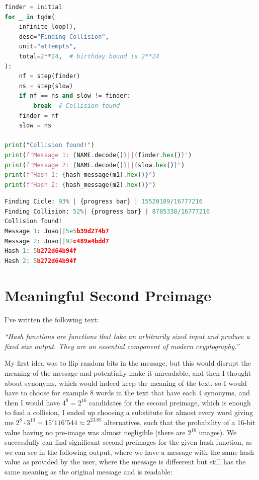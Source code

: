 \documentclass{article}
\begin{document}
\begin{lstlisting}[language=Python]
finder = initial
for _ in tqdm(
    infinite_loop(),
    desc="Finding Collision",
    unit="attempts",
    total=2**24,  # birthday bound is 2**24
):
    nf = step(finder)
    ns = step(slow)
    if nf == ns and slow != finder:
        break  # Collision found
    finder = nf
    slow = ns

print("Collision found!")
print(f"Message 1: {NAME.decode()}||{finder.hex()}")
print(f"Message 2: {NAME.decode()}||{slow.hex()}")
print(f"Hash 1: {hash_message(m1).hex()}")
print(f"Hash 2: {hash_message(m2).hex()}")
\end{lstlisting}


\begin{lstlisting}[language=Python]
Finding Cicle: 93% | {progress bar} | 15520189/16777216
Finding Collision: 52%| {progress bar} | 8785338/16777216
Collision found!
Message 1: Joao||5e5b39d274b7
Message 2: Joao||92c489a4bdd7
Hash 1: 5b272d64b94f
Hash 2: 5b272d64b94f
\end{lstlisting}

\section{Meaningful Second Preimage}
I've written the following text:\\
\begin{center}
    \textit{``Hash functions are functions that take an arbitrarily sized input and produce a fixed size output. They are an essential component of modern cryptography.''}
\end{center}

My first idea was to flip random bits in the message, but this would disrupt the meaning of the message and potentially make it unreadable, and then I thought about synonyms, which would indeed keep the meaning of the text, so I would have to choose for example 8 words in the text that have each 4 synonyms, and then I would have $4^8 = 2^{16}$ candidates for the second preimage, which is enough to find a collision, I ended up choosing a substitute for almost every word giving me $2^8 \cdot 3^{10} = 15'116'544 \approx 2^{23.85}$ alternatives, such that the probability of a 16-bit value having no pre-image was almost negligible (there are $2^{16}$ images).
We successfully can find significant second preimages for the given hash function, as we can see in the following output, where we have a message with the same hash value as provided by the user, where the message is diffeerent but still has the same meaning as the original message and is readable:
\end{document}
